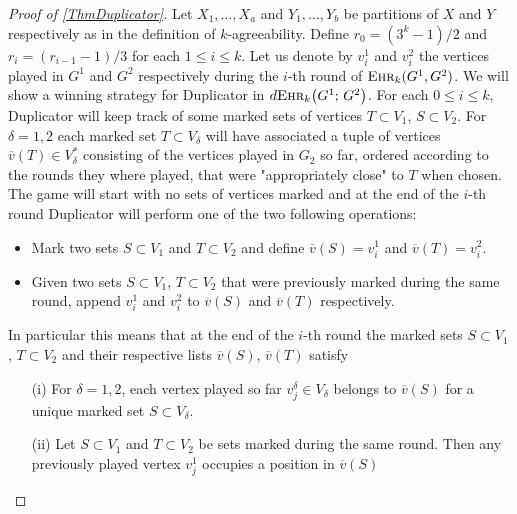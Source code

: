 \documentclass[12pt,notitlepage,a4paper]{article}
\theoremstyle{definition}
\newcommand{\ehr}{\textsc{Ehr}}
\begin{document}
\begin{proof}[Proof of \cref{ThmDuplicator}]
	Let $X_1,\dots,X_a$ and 
	$Y_1,\dots,Y_b$ be partitions of 
	$X$ and $Y$ respectively
	as in the definition of $k$-agreeability.
	Define $r_0=(3^k-1)/2$ and $r_i=(r_{i-1}-1)/3$ for each
	$1\leq i \leq k$. 
	Let us denote by $v^1_i$ and $v^2_i$ the vertices played
	in $G^1$ and $G^2$ respectively during the $i$-th
	round of $\ehr_k(G^1,G^2)$. 
	We will show a winning strategy for Duplicator
	in $d\ehr_{k}\big(G^1;\, G^2\big)$. For each $0\leq i \leq k$,
	Duplicator will	keep track of some marked sets 
	of vertices $T\subset V_1$, $S\subset V_2$. 
	For $\delta=1,2$ each marked set
	$T\subset V_\delta$ will have associated a tuple
	of vertices $\overline{v}(T)\in V_\delta^*$ consisting
	of the vertices played in $G_2$ so far, ordered according
	to the rounds they where played, that were 
	"appropriately close" to $T$ when chosen.
	The game will start with no sets of vertices marked and 
	at the end of the $i$-th
	round Duplicator will perform one of the two
	following operations:
	\begin{itemize}
	\item Mark two sets $S\subset V_1$ and $T\subset V_2$ and
	define $\overline{v}(S)=v^1_i$ and $\overline{v}(T)=v^2_i$.
	\item Given two sets $S\subset V_1$, $T\subset V_2$ that were 
	previously marked during the same round, append $v^1_i$
	and $v^2_i$ to $\overline{v}(S)$ and $\overline{v}(T)$ 
	respectively. 
	\end{itemize}
	In particular this means that at the 
	end of the $i$-th round the marked sets $S\subset V_1$
	, $T\subset V_2$ and their respective lists $\overline{v}(S)$,
	$\overline{v}(T)$ satisfy
	\begin{itemize}
		\item[(i)] For $\delta=1,2$, each vertex played
		so far $v^\delta_j\in V_\delta$ belongs to 
		$\overline{v}(S)$ for a	 unique marked set 
		$S\subset V_\delta$.
		\item[(ii)] Let $S\subset V_1$ and $T\subset V_2$ be sets
		marked during the same round. Then any previously played
		vertex $v^1_j$ occupies a position in $\overline{v}(S)$

\end{itemize}
\end{proof}
\end{document}
